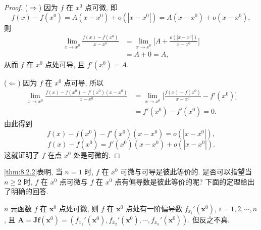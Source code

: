 \begin{proof}
($\Rightarrow$) 因为 $f$ 在 $x^{0}$ 点可微, 即
\[
  f(x) - f(x^{0}) = A(x - x^{0}) + o(|x - x^{0}|) = A(x - x^{0}) + o(x - x^{0}),
\]
则
\begin{align*}
  \lim_{x \to x^{0}}\frac{f(x) - f(x^{0})}{x - x^{0}}
  &= \lim_{x \to x^{0}}\Big[A + \frac{o(|x - x^{0}|)}{x - x^{0}}\Big] \\
  &= A + 0 = A,
\end{align*}
从而 $f$ 在 $x^{0}$ 点处可导, 且 $f'(x^{0}) = A$.

($\Leftarrow$) 因为 $f$ 在 $x^{0}$ 点可导, 所以
\begin{align*}
  \lim_{x \to x^{0}}\frac{f(x) - f(x^{0}) - f'(x^{0})(x - x^{0})}{x - x^{0}}
  &= \lim_{x \to x^{0}}\Big[\frac{f(x) - f(x^{0})}{x - x^{0}} - f'(x^{0})\Big] \\
  &= f'(x^{0}) - f'(x^{0}) = 0.
\end{align*}
由此得到
\[
  f(x) - f(x^{0}) - f'(x^{0})(x - x^{0}) = o(|x - x^{0}|),
\]
\[
  f(x) - f(x^{0}) = f'(x^{0})(x - x^{0}) + o(|x - x^{0}|).
\]
这就证明了 $f$ 在点 $x^{0}$ 处是可微的.
\end{proof}

\cref{thm:8.2.2}表明, 当 $n = 1$ 时, $f$ 在 $x^{0}$ 可微与可导是彼此等价的. 是否可以指望当 $n \geqslant 2$ 时, $f$ 在 $x^{0}$ 点可微与 $f$ 在 $x^{0}$ 点有偏导数是彼此等价的呢? 下面的定理给出了明确的回答.

\begin{theorem}[可微的必要条件]\label{thm:8.2.3}
$n$ 元函数 $f$ 在 $\boldsymbol{x}^{0}$ 点处可微, 则 $f$ 在 $\boldsymbol{x}^{0}$ 点处有一阶偏导数 $f_{x_{i}}'(\boldsymbol{x}^{0})$, $i = 1, 2, \cdots, n$, 且 $\boldsymbol{A} = \boldsymbol{J}\boldsymbol{f}(\boldsymbol{x}^{0}) = (f_{x_{1}}'(\boldsymbol{x}^{0}), f_{x_{2}}'(\boldsymbol{x}^{0}), \cdots, f_{x_{n}}'(\boldsymbol{x}^{0}))$. 但反之不真.
\end{theorem}

